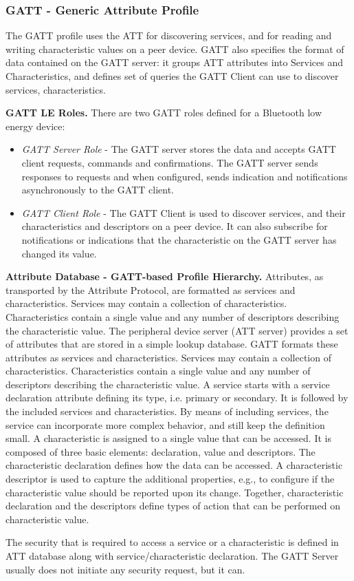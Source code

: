 

\subsubsection{GATT - Generic Attribute Profile}
The GATT profile uses the ATT for discovering services, and for reading and writing characteristic values on a peer device. GATT also specifies the format of data contained on the GATT server: it groups ATT attributes into Services and Characteristics, and defines set of queries the GATT Client can use to discover services, characteristics.

\textbf{GATT LE Roles.}
There are two GATT roles defined for a Bluetooth low energy device:
\begin{itemize}
\item \emph{GATT Server Role} - The GATT server stores the data and accepts GATT client requests, commands and confirmations. The GATT server sends responses to requests and when configured, sends indication and notifications asynchronously to the GATT client. 
\item \emph{GATT Client Role} - The GATT Client is used to discover services, and their characteristics and descriptors on a peer device. It can also subscribe for notifications or indications that the characteristic on the GATT server has changed its value. 
\end{itemize}

\textbf{Attribute Database - GATT-based Profile Hierarchy.}
Attributes, as transported by the Attribute Protocol, are formatted as services and characteristics. Services may contain a collection of characteristics. Characteristics contain a single value and any number of descriptors describing the characteristic value. The peripheral device server (ATT server) provides a set of attributes that are stored in a simple lookup database. GATT formats these attributes as services and characteristics. Services may contain a collection of characteristics. Characteristics contain a single value and any number of descriptors describing the characteristic value. A service starts with a service declaration attribute defining its type, i.e. primary or secondary. It is followed by the included services and characteristics. By means of including services, the service can incorporate more complex behavior, and still keep the definition small. A characteristic is assigned to a single value that can be accessed. It is composed of three basic elements: declaration, value and descriptors. The characteristic declaration defines how the data can be accessed. A characteristic descriptor is used to capture the additional properties, e.g., to configure if the characteristic value should be reported upon its change. Together, characteristic declaration and the descriptors define types of action that can be performed on characteristic value.

The security that is required to access a service or a characteristic is defined in ATT database along with service/characteristic declaration. The GATT Server usually does not initiate any security request, but it can. 
